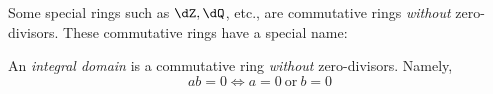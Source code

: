 \documentclass{amsart}
\begin{document}
Some special rings such as $\dZ, \dQ$, etc., are commutative rings \emph{without} zero-divisors.
These commutative rings have a special name:
\begin{defn}
  An \emph{integral domain} is a commutative ring \emph{without} zero-divisors.
  Namely,
  \[
    ab = 0 \iff a = 0~\text{or}~b = 0
  \]
\end{defn}
\end{document}
